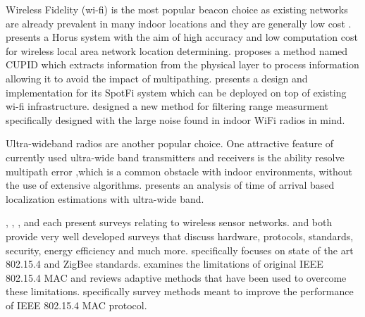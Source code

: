 \documentclass[conference]{IEEEtran}
\begin{document}
			Wireless Fidelity (wi-fi)  is the most popular beacon choice as existing networks are already prevalent in many indoor locations and they are generally low cost \cite{Youssef2005} \cite{Sen2013} \cite{Kotaru2015} \cite{Rea2017}. \cite{Youssef2005} presents a Horus system with the aim of high accuracy and low computation cost for wireless local area network location determining. \cite{Sen2013} proposes a method named CUPID which extracts information from the physical layer to process information allowing it to avoid the impact of multipathing. \cite{Kotaru2015} presents a design and implementation for its SpotFi system which can be deployed on top of existing wi-fi infrastructure. \cite{Rea2017} designed a new method for filtering range measurment specifically designed with the large noise found in indoor WiFi radios in mind. 
			
			Ultra-wideband radios are another popular choice. One attractive feature of currently used ultra-wide band transmitters and receivers is the ability resolve multipath error ,which is a common obstacle with indoor environments, without the use of extensive algorithms. \cite{Gezici2005} presents an analysis of time of arrival based localization estimations with ultra-wide band. 
			
			 \cite{Baronti2007}, \cite{Khanafer2014}, \cite{Akyildiz2002}, and \cite{Xia2011} each present surveys relating to wireless sensor networks.  \cite{Baronti2007} and \cite{Akyildiz2002} both provide very well developed surveys that discuss hardware, protocols, standards, security, energy efficiency and much more. \cite{Baronti2007} specifically focuses on state of the art 802.15.4 and ZigBee standards. \cite{Xia2011} examines the limitations of original IEEE 802.15.4 MAC and reviews adaptive methods that have been used to overcome these limitations. \cite{Khanafer2014} specifically survey methods meant to improve the performance of IEEE 802.15.4 MAC protocol.

			
			
			
			
			
\end{document}
